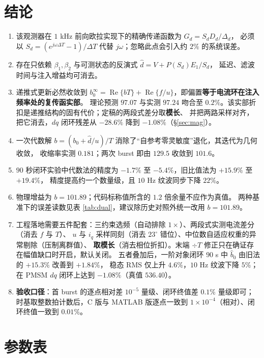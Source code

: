 \documentclass[11pt,a4paper]{ctexart}
\newcommand{\RE}{\operatorname{Re}}
\begin{document}
\section{结论}

\begin{enumerate}
\item 该观测器在 $1$ kHz 前向欧拉实现下的精确传递函数为 $G_d=S_dD_d/\Delta_d$，
必须以 $S_d=(e^{j\omega\Delta T}-1)/\Delta T$ 代替 $j\omega$；忽略此点会引入约 $2\%$ 的系统误差。
\item 存在只依赖 $\beta_1,\beta_2$ 与可测状态的反演式 $\hat d=V+P(S_d)E_1/S_d$，
延迟、滤波时间与注入增益均可消去。
\item 递推式更新必然收敛到 $b_0^{\infty}=\RE\{bT\}+\RE\{f/u\}$，即偏置\textbf{等于电流环在注入频率处的复传函实部}。
理论预测 $97.07$ 与实测 $97.24$ 吻合至 $0.2\%$。该实部折扣是递推结构的固有代价；定稿的两段式差分取\textbf{模长}、
并把两路采样对齐，把它消去，$dq$ 闭环残差从 $-28.6\%$ 降到 $-1.08\%$（\S\ref{sec:mag}）。
\item 一次代数解 $b=(b_0+\hat d/u)/T$ 消除了“自参考零灵敏度”退化，其迭代为几何收敛，
收缩率实测 $0.181$；两次 burst 即由 $129.5$ 收敛到 $101.6$。
\item $90$ 秒闭环实验中代数法的精度为 $-1.7\%$ 至 $-5.4\%$，旧比值法为 $+15.9\%$ 至 $+19.4\%$，
精度提高约一个数量级，且 $10$ Hz 纹波同步下降 $22\%$。
\item 物理增益为 $b=101.89$；代码标称值所含的 $1.2$ 倍余量不应作为真值。
两种基准下的误差读数见表 \ref{tab:dual}，建议除历史对照外统一改用 $b=101.89$。
\item 工程落地需要五件配套：三约束选频（自动排除 $1\times$）、两段式实测电流差分（消去 $f$ 与 $T$）、
$u$ 与 $i_q$ 采样同刻（消去 $23^\circ$ 错位）、中位数自适应权重的异常剔除（压制离群值）、
\textbf{取模长}（消去相位折扣）。末端 $\div T$ 修正只在确证存在幅值缺口时开启，默认关闭。
五者叠加后，一阶对象闭环 $90$ s 中 $\hat b_0$ 由旧法的 $+15.3\%$ 改善到 $+1.84\%$，
稳态 RMS 仅上升 $4.6\%$，$10$ Hz 纹波下降 $5\%$；在 PMSM $dq$ 闭环上达到 $-1.08\%$（真值 $536.40$）。
\item \textbf{验收口径}：首 burst 的逐点相对差 $10^{-5}$ 量级、闭环终值差 $0.1\%$ 量级即可；
时基取整数拍计数后，C 版与 MATLAB 版逐点一致到 $1\times10^{-4}$（相对）、闭环终值一致到 $0.01\%$。
\end{enumerate}

\appendix

\section{参数表}
\end{document}
